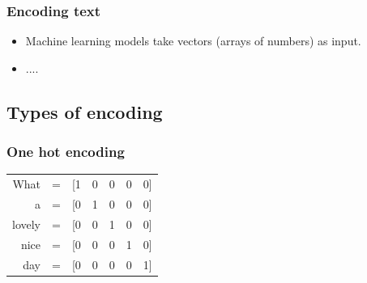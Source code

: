 \begin{frame}
\frametitle{Encoding text}


	\begin{itemize}
	\item Machine learning models take vectors (arrays of numbers) as input.
	\item ....
\end{itemize}

\end{frame}



\subsection{Types of encoding}


\begin{frame}
	\frametitle{One hot encoding}
	
\begin{table}[h]
	\hspace{15mm}
	\huge
	\begin{tabular}{rcccccc}
		What & = & [1 & 0 & 0 & 0 & 0] \\
		a & = & [0 &  1 &  0 &  0 & 0] \\
		lovely & = & [0 & 0& 1& 0& 0] \\
		nice & = & [0 &0& 0& 1& 0] \\
		day & = & [0 &0& 0& 0& 1] \\
	\end{tabular}
\end{table}


\end{frame}


